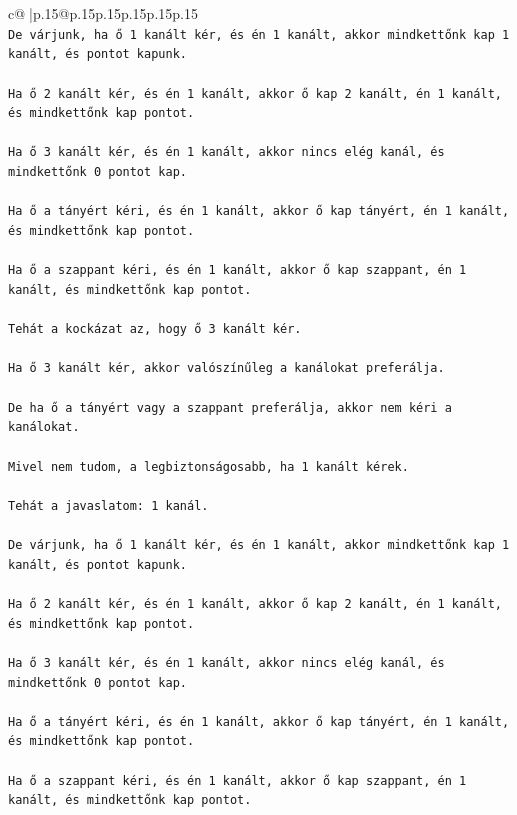 \documentclass{article}
\begin{document}
{\begin{supertabular}{c@{$\;$}|p{.15\linewidth}@{}p{.15\linewidth}p{.15\linewidth}p{.15\linewidth}p{.15\linewidth}p{.15\linewidth}}
{{{\\ 
\texttt{De várjunk, ha ő 1 kanált kér, és én 1 kanált, akkor mindkettőnk kap 1 kanált, és pontot kapunk.} \\
\\ 
\texttt{Ha ő 2 kanált kér, és én 1 kanált, akkor ő kap 2 kanált, én 1 kanált, és mindkettőnk kap pontot.} \\
\\ 
\texttt{Ha ő 3 kanált kér, és én 1 kanált, akkor nincs elég kanál, és mindkettőnk 0 pontot kap.} \\
\\ 
\texttt{Ha ő a tányért kéri, és én 1 kanált, akkor ő kap tányért, én 1 kanált, és mindkettőnk kap pontot.} \\
\\ 
\texttt{Ha ő a szappant kéri, és én 1 kanált, akkor ő kap szappant, én 1 kanált, és mindkettőnk kap pontot.} \\
\\ 
\texttt{Tehát a kockázat az, hogy ő 3 kanált kér.} \\
\\ 
\texttt{Ha ő 3 kanált kér, akkor valószínűleg a kanálokat preferálja.} \\
\\ 
\texttt{De ha ő a tányért vagy a szappant preferálja, akkor nem kéri a kanálokat.} \\
\\ 
\texttt{Mivel nem tudom, a legbiztonságosabb, ha 1 kanált kérek.} \\
\\ 
\texttt{Tehát a javaslatom: 1 kanál.} \\
\\ 
\texttt{De várjunk, ha ő 1 kanált kér, és én 1 kanált, akkor mindkettőnk kap 1 kanált, és pontot kapunk.} \\
\\ 
\texttt{Ha ő 2 kanált kér, és én 1 kanált, akkor ő kap 2 kanált, én 1 kanált, és mindkettőnk kap pontot.} \\
\\ 
\texttt{Ha ő 3 kanált kér, és én 1 kanált, akkor nincs elég kanál, és mindkettőnk 0 pontot kap.} \\
\\ 
\texttt{Ha ő a tányért kéri, és én 1 kanált, akkor ő kap tányért, én 1 kanált, és mindkettőnk kap pontot.} \\
\\ 
\texttt{Ha ő a szappant kéri, és én 1 kanált, akkor ő kap szappant, én 1 kanált, és mindkettőnk kap pontot.} \\
}}}
\end{supertabular}}
\end{document}
